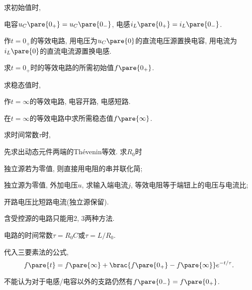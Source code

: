 \documentclass{ctexart}
\begin{document}
\begin{cenum}
    \item 求初始值时,
    \begin{cenum}
        \item 电容$u_C\pare{0_+} = u_C\pare{0_-}$, 电感$i_L\pare{0_+} = i_L\pare{0_-}$.
        \item 作$t=0_+$的等效电路, 用电压为$u_C\pare{0}$的直流电压源置换电容, 用电流为$i_L\pare{0}$的直流电流源置换电感.
        \item 求$t=0_+$时的等效电路的所需初始值$f\pare{0_+}$.
    \end{cenum}
    \item 求稳态值时,
    \begin{cenum}
        \item 作$t=\infty$的等效电路, 电容开路, 电感短路.
        \item 在$t=\infty$的等效电路中求所需稳态值$f\pare{\infty}$.
    \end{cenum}
    \item 求时间常数$\tau$时,
    \begin{cenum}
        \item 先求出动态元件两端的Th\'evenin等效. 求$R_0$时
        \begin{cenum}
            \item 独立源若为零值, 则直接用电阻的串并联化简;
            \item 独立源为零值, 外加电压$u$, 求输入端电流$j$, 等效电阻等于端钮上的电压与电流比;
            \item 开路电压比短路电流(独立源保留).
        \end{cenum}
        \item 含受控源的电路只能用2, 3两种方法.
        \item 电路的时间常数$\tau = R_0C$或$\tau = L/R_0$.
    \end{cenum}
    \item 代入三要素法的公式,
    \[ f\pare{t} = f\pare{\infty} + \brac{f\pare{0_+} - f\pare{\infty}}e^{-t/\tau}. \]
\end{cenum}
\begin{sample}
    \begin{ex}
    \end{ex}
\end{sample}
\begin{pitfall}
    不能认为对于电感/电容以外的支路仍然有$f\pare{0_-}=f\pare{0_+}$.
\end{pitfall}
\end{document}
